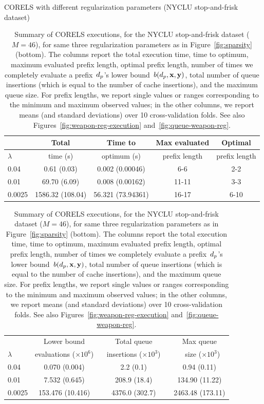 \begin{table}[t!]
\centering
CORELS with different regularization parameters (NYCLU stop-and-frisk dataset) \\
\vspace{2mm}
\begin{tabular}{l | c | c | c | c}
& Total & Time to & Max evaluated & Optimal \\
\hline
$\lambda$ & time (s) & optimum (s) & prefix length & prefix length \\
0.04 & 0.61 (0.03) & 0.002 (0.00046) & 6-6 & 2-2 \\
0.01 & 69.70 (6.09) & 0.008 (0.00162) & 11-11 & 3-3 \\
0.0025 & 1586.32 (108.04) & 56.321 (73.94361) & 16-17 & 6-10 \\
\hline
\end{tabular}
\begin{tabular}{l | c | c | c}
\hline
& Lower bound & Total queue &  Max queue \\
$\lambda$ & evaluations ($\times 10^6$) &~ insertions ($\times 10^3$) ~&~ size ($\times 10^3$) \\
\hline
0.04 & 0.070 (0.004) & 2.2 (0.1) & 0.94 (0.11) \\
0.01 & 7.532 (0.645) & 208.9 (18.4) & 134.90 (11.22) \\
0.0025 & 153.476 (10.416) & 4376.0 (302.7) & 2463.48 (173.11) \\
\end{tabular}
\caption{Summary of CORELS executions, for the NYCLU stop-and-frisk dataset (${M = 46}$),
for same three regularization parameters as in Figure~\ref{fig:sparsity} (bottom).
%
The columns report the total execution time,
time to optimum, maximum evaluated prefix length, optimal prefix length,
number of times we completely evaluate a prefix~$d_p$'s lower bound~$b(d_p, \mathbf{x}, \mathbf{y})$,
total number of queue insertions (which is equal to the number of cache insertions),
and the maximum queue size.
%
For prefix lengths, we report single values or ranges corresponding to the minimum and maximum observed values;
in the other columns, we report means (and standard deviations) over 10 cross-validation folds.
%
See also Figures~\ref{fig:weapon-reg-execution} and~\ref{fig:queue-weapon-reg}.
}
\vspace{4mm}
\label{tab:weapon-reg}
\end{table}

